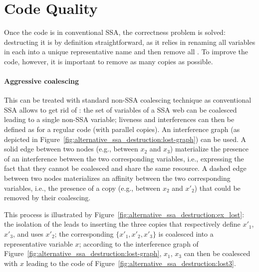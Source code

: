 \section{Code Quality}
\label{sec:destruct:quality}
Once the code is in conventional SSA, the correctness problem is solved: 
destructing it is by definition straightforward, as it relies in renaming all variables in each \phiweb into a unique representative name and then remove all \phifuns. 
To improve the code, however, it is important to remove as many copies as possible.

\paragraph{Aggressive coalescing}
This can be treated with standard non-SSA coalescing technique as conventional SSA allows to get rid of \phifuns: 
the set of variables of a SSA web can be coalesced leading to a single non-SSA variable; 
liveness and interferences can then be defined as for a regular code (with parallel copies). 
An interference graph (as depicted in Figure~\ref{fig:alternative_ssa_destruction:lost-graph}) can be used. 
A solid edge between two nodes (e.g., between $x_2$ and $x_3$) materialize the presence of an interference between the two corresponding variables, i.e., expressing the fact that they cannot be coalesced and share the same resource. 
A dashed edge between two nodes materializes an affinity between the two corresponding variables, i.e., the presence of a copy (e.g., between $x_2$ and $x'_2$) that could be removed by their coalescing.

This process is illustrated by Figure~\ref{fig:alternative_ssa_destruction:ex_lost}: 
the isolation of the \phifun leads to inserting the three copies that respectively define $x'_1$, $x'_3$, and uses $x'_2$; 
the corresponding \phiweb $\{x'_1, x'_2, x'_3\}$ is coalesced into a representative variable $x$; 
according to the interference graph of Figure~\ref{fig:alternative_ssa_destruction:lost-graph}, $x_1$, $x_3$ can then be coalesced with $x$ leading to the code of Figure~\ref{fig:alternative_ssa_destruction:lost3}.

